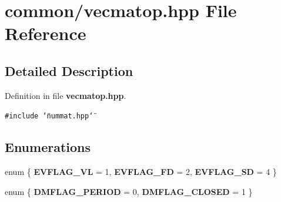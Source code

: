 \section{common/vecmatop.hpp File Reference}
\label{vecmatop_8hpp}


\subsection{Detailed Description}


Definition in file {\bf vecmatop.hpp}.

{\tt \#include \char`\"{}nummat.hpp\char`\"{}}\par
\subsection*{Enumerations}
\begin{CompactItemize}
\item 
enum \{ {\bf EVFLAG\_\-VL} =  1, 
{\bf EVFLAG\_\-FD} =  2, 
{\bf EVFLAG\_\-SD} =  4
 \}
\item 
enum \{ {\bf DMFLAG\_\-PERIOD} =  0, 
{\bf DMFLAG\_\-CLOSED} =  1
 \}
\end{CompactItemize}
